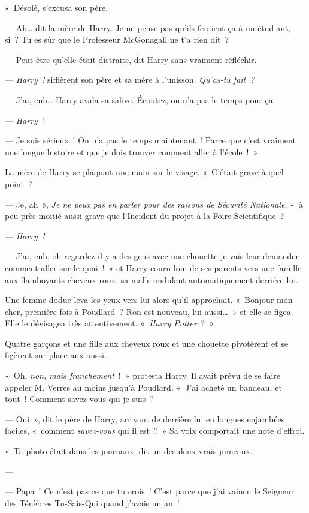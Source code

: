 «~Désolé, s'excusa son père.

--- Ah… dit la mère de Harry. Je ne pense pas qu'ils feraient ça à un étudiant, si~? Tu es sûr que le Professeur McGonagall ne t'a rien dit~?

--- Peut-être qu'elle était distraite, dit Harry sans vraiment réfléchir.

--- \emph{Harry~!} sifflèrent son père et sa mère à l'unisson. \emph{Qu'as-tu fait~?}

--- J'ai, euh… Harry avala sa salive. Écoutez, on n'a pas le temps pour ça.

--- \emph{Harry}~!

--- Je suis sérieux~! On n'a pas le temps maintenant~! Parce que c'est vraiment une longue histoire et que je dois trouver comment aller à l'école~!~»

La mère de Harry se plaquait une main sur le visage.
«~C'était grave à quel point~?

--- Je, ah~», \emph{Je ne peux pas en parler pour des raisons de Sécurité Nationale}, «~à peu près moitié aussi grave que l'Incident du projet à la Foire Scientifique~?

--- \emph{Harry~!}

--- J'ai, euh, oh regardez il y a des gens avec une chouette je vais leur demander comment aller sur le quai~!~» et Harry couru loin de ses parents vers une famille aux flamboyants cheveux roux, sa malle ondulant automatiquement derrière lui.

Une femme dodue leva les yeux vers lui alors qu'il approchait. «~Bonjour mon cher, première fois à Poudlard~? Ron est nouveau, lui aussi…~» et elle se figea. Elle le dévisagea très attentivement. «~\emph{Harry Potter}~?~»

Quatre garçons et une fille aux cheveux roux et une chouette pivotèrent et se figèrent sur place aux aussi.

«~Oh, \emph{non, mais franchement}~!~» protesta Harry. Il avait prévu de se faire appeler M. Verres au moins jusqu'à Poudlard. «~J'ai acheté un bandeau, et tout~! Comment savez-vous qui je suis~?

--- Oui~», dit le père de Harry, arrivant de derrière lui en longues enjambées faciles, «~comment \emph{savez-vous} qui il est~?~» Sa voix comportait une note d'effroi.

«~Ta photo était dans les journaux, dit un des deux vrais jumeaux.

--- 

--- Papa~! Ce n'est pas ce que tu crois~! C'est parce que j'ai vaincu le Seigneur des Ténèbres Tu-Sais-Qui quand j'avais un an~!


